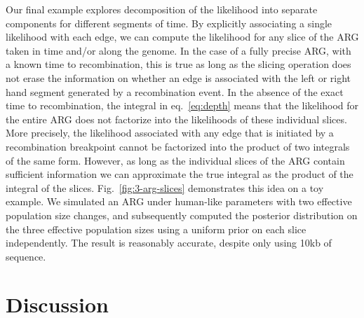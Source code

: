 \documentclass{article}
\begin{document}
Our final example explores decomposition of the likelihood
into separate components for different segments of time.
By explicitly associating a single likelihood with each edge,
we can compute the likelihood for any slice of the ARG taken in
time and/or along the genome.
In the case of a fully precise ARG, with a known time to recombination,
this is true as long as the slicing operation does not erase the
information on whether an edge is associated with the left or
right hand segment generated by a recombination event. In the absence
of the exact time to recombination, the integral in
eq.~\eqref{eq:depth} means that the likelihood
for the entire ARG does not factorize into the likelihoods of these
individual slices. More precisely, the likelihood associated with any
edge that is initiated by a recombination breakpoint cannot be factorized
into the product of two integrals of the same form.
However, as long as the individual slices of the ARG contain sufficient
information we can approximate the true integral as the product of the
integral of the slices. Fig.~\ref{fig:3-arg-slices} demonstrates this idea
on a toy example. We simulated an ARG under human-like parameters with
two effective population size changes, and subsequently computed the posterior
distribution on the three effective population sizes
using a uniform prior on each slice independently.
The result is reasonably accurate, despite only using 10kb of sequence.




\section*{Discussion}
\end{document}
